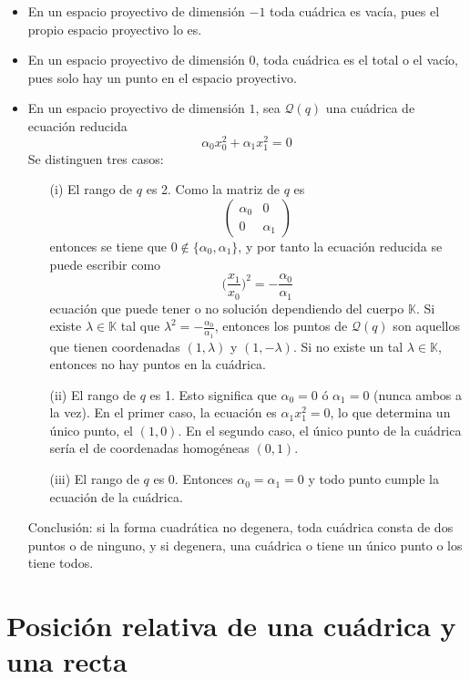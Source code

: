 \documentclass[12pt]{report}
\theoremstyle{definition}
\theoremstyle{definition}
\theoremstyle{remark}
\begin{document}
\begin{itemize}
    \item En un espacio proyectivo de dimensión $-1$ toda cuádrica es vacía, pues el propio espacio proyectivo lo es.
    \item En un espacio proyectivo de dimensión $0$, toda cuádrica es el total o el vacío, pues solo hay un punto en el espacio proyectivo.
    \item En un espacio proyectivo de dimensión $1$, sea $\mathcal{Q}(q)$ una cuádrica de ecuación reducida
    \[\alpha_0x_0^2+\alpha_1x_1^2 = 0\]
    Se distinguen tres casos:
    \begin{itemize}
        \item[(i)] El rango de $q$ es 2. Como la matriz de $q$ es
        \[\begin{pmatrix*}
            \alpha_0 & 0 \\
            0 & \alpha_1
        \end{pmatrix*}\]
        entonces se tiene que $0 \notin \{\alpha_0, \alpha_1\}$, y por tanto la ecuación reducida se puede escribir como
        \[\biggl( \frac{x_1}{x_0} \biggr)^2 = -\frac{\alpha_0}{\alpha_1}\]
        ecuación que puede tener o no solución dependiendo del cuerpo $\mathbb{K}$. Si existe $\lambda \in \mathbb{K}$ tal que $\lambda^2 = -\frac{\alpha_0}{\alpha_1}$, entonces los puntos de $\mathcal{Q}(q)$ son aquellos que tienen coordenadas $(1, \lambda)$ y $(1, - \lambda)$. Si no existe un tal $\lambda \in \mathbb{K}$, entonces no hay puntos en la cuádrica.
        \item[(ii)] El rango de $q$ es 1. Esto significa que $\alpha_0 = 0$ ó $\alpha_1 = 0$ (nunca ambos a la vez). En el primer caso, la ecuación es $\alpha_1x_1^2 = 0$, lo que determina un único punto, el $(1,0)$. En el segundo caso, el único punto de la cuádrica sería el de coordenadas homogéneas $(0,1)$.
        \item[(iii)] El rango de $q$ es 0. Entonces $\alpha_0 = \alpha_1 = 0$ y todo punto cumple la ecuación de la cuádrica.
    \end{itemize}
    Conclusión: si la forma cuadrática no degenera, toda cuádrica consta de dos puntos o de ninguno, y si degenera, una cuádrica o tiene un único punto o los tiene todos.
\end{itemize}

\section{Posición relativa de una cuádrica y una recta}
\label{sec5.3.}
\end{document}
